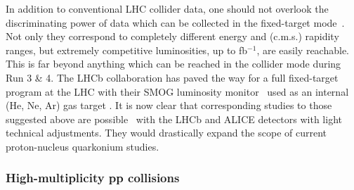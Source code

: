 \documentclass[../report.tex]{subfiles}
\begin{document}

In addition to conventional LHC collider data, one should not overlook the discriminating power of data which can be collected in the fixed-target mode~\cite{Brodsky:2012vg,Lansberg:2012kf}. Not only they correspond to completely different energy and (c.m.s.) rapidity ranges, but extremely competitive luminosities, up to fb$^{-1}$, are easily reachable. This is far beyond anything which can be reached in the collider mode during Run 3 \& 4. The LHCb collaboration has paved the way for a full fixed-target program at the LHC with their SMOG luminosity monitor~\cite{FerroLuzzi:2005em} used as an internal (He, Ne, Ar) gas target \cite{Aaij:2018ogq}. It is now clear that corresponding studies to those suggested above are possible~\cite{Hadjidakis:2018ifr} with the LHCb and ALICE detectors with light technical adjustments. They would drastically expand the scope of current proton-nucleus quarkonium studies.

\subsubsection{High-multiplicity pp collisions} %

\end{document}

